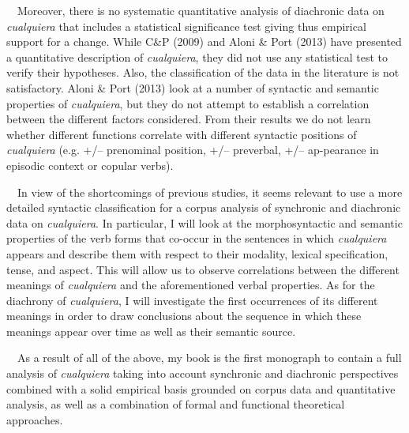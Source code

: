\begin{styleStandard}
\ \ Moreover, there is no systematic quantitative analysis of diachronic data on \textit{cualquiera} that includes a statistical significance test giving thus empirical support for a change. While C\&P (2009) and Aloni \& Port (2013) have presented a quantitative description of \textit{cualquiera}, they did not use any statistical test to verify their hypotheses. Also, the classification of the data in the literature is not satisfactory. Aloni \& Port (2013) look at a number of syntactic and semantic properties of \textit{cualquiera}, but they do not attempt to establish a correlation between the different factors considered. From their results we do not learn whether different functions correlate with different syntactic positions of \textit{cualquiera} (e.g. +/– prenominal position, +/– preverbal, +/– ap-pearance in episodic context or copular verbs). 
\end{styleStandard}

\begin{styleStandard}
\ \ In view of the shortcomings of previous studies, it seems relevant to use a more detailed syntactic classification for a corpus analysis of synchronic and diachronic data on \textit{cualquiera}. In particular, I will look at the morphosyntactic and semantic properties of the verb forms that co-occur in the sentences in which \textit{cualquiera} appears and describe them with respect to their modality, lexical specification, tense, and aspect. This will allow us to observe correlations between the different meanings of \textit{cualquiera} and the aforementioned verbal properties. As for the diachrony of \textit{cualquiera}, I will investigate the first occurrences of its different meanings in order to draw conclusions about the sequence in which these meanings appear over time as well as their semantic source.
\end{styleStandard}

\begin{styleStandard}
\ \ As a result of all of the above, my book is the first monograph to contain a full analysis of \textit{cualquiera} taking into account synchronic and diachronic perspectives combined with a solid empirical basis grounded on corpus data and quantitative analysis, as well as a combination of formal and functional theoretical approaches.
\end{styleStandard}

